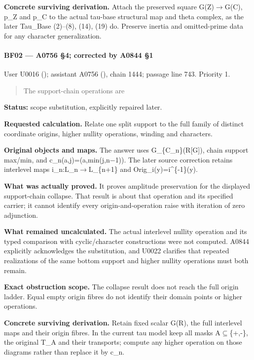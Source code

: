 \textbf{Concrete surviving derivation.} Attach the preserved square
G(Z)\allowbreak{}\ensuremath{→}\allowbreak{}G(C), p\_Z and p\_C to the
actual tau-base structural map and theta complex, as the later Tau\_Base
(2)--(8), (14), (19) do. Preserve inertia and omitted-prime data for any
character generalization.

\paragraph{BF02 --- A0756 §4; corrected by A0844
§1}\label{bf02-a0756-4-corrected-by-a0844-1}

User U0016 (\protect{});
assistant A0756 (\protect{}),
chain 1444; passage line 743. Priority 1.

\begin{quote}
The support-chain operations are
\end{quote}

\textbf{Status:} scope substitution, explicitly repaired later.

\textbf{Requested calculation.} Relate one split support to the full
family of distinct coordinate origins, higher nullity operations,
winding and characters.

\textbf{Original objects and maps.} The answer uses
G\_\{C\_n\}(R{[}G{]}), chain support max/min, and
c\_n(a,j)=(a,min(j,n\allowbreak{}\ensuremath{−}\allowbreak{}1)). The
later source correction retains interlevel maps
i\_n:L\_n\allowbreak{}\ensuremath{→}\allowbreak{}L\_\{n+1\} and
Orig\_i(y)=i\^{}\{-1\}(y).

\textbf{What was actually proved.} It proves amplitude preservation for
the displayed support-chain collapse. That result is about that
operation and its specified carrier; it cannot identify every
origin-and-operation raise with iteration of zero adjunction.

\textbf{What remained uncalculated.} The actual interlevel nullity
operation and its typed comparison with cyclic/character constructions
were not computed. A0844 explicitly acknowledges the substitution, and
U0022 clarifies that repeated realizations of the same bottom support
and higher nullity operations must both remain.

\textbf{Exact obstruction scope.} The collapse result does not reach the
full origin ladder. Equal empty origin fibres do not identify their
domain points or higher operations.

\textbf{Concrete surviving derivation.} Retain fixed scalar G(R), the
full interlevel maps and their origin fibres. In the current tau model
keep all masks A\allowbreak{}\ensuremath{⊆}\allowbreak{}\{+,-\}, the
original T\_A and their transports; compute any higher operation on
those diagrams rather than replace it by c\_n.

